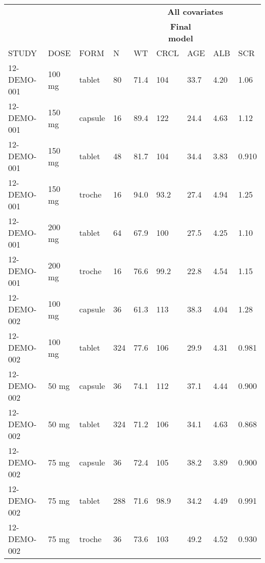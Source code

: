 \documentclass[
]{article}
\newenvironment{Shaded}{\begin{snugshade}}{\end{snugshade}}
\newcommand{\ControlFlowTok}[1]{\textcolor[rgb]{0.13,0.29,0.53}{\textbf{#1}}}
\newcommand{\DataTypeTok}[1]{\textcolor[rgb]{0.13,0.29,0.53}{#1}}
\newcommand{\KeywordTok}[1]{\textcolor[rgb]{0.13,0.29,0.53}{\textbf{#1}}}
\newcommand{\NormalTok}[1]{#1}
\newcommand{\OperatorTok}[1]{\textcolor[rgb]{0.81,0.36,0.00}{\textbf{#1}}}
\newcommand{\StringTok}[1]{\textcolor[rgb]{0.31,0.60,0.02}{#1}}
\begin{document}
\begin{table}[h]
\centering
{\def\arraystretch{1.4}\tabcolsep=5pt
\begin{threeparttable}
\begin{tabular}[h]{lllllllll}
\hline
\multicolumn{4}{c}{} & \multicolumn{5}{c}{\textbf{All covariates}}\\
\cmidrule(lr){5-9}
\multicolumn{5}{c}{} & \multicolumn{2}{c}{\textbf{Final model}} & \multicolumn{2}{c}{}\\
\cmidrule(lr){6-7}
STUDY & DOSE & FORM & N & WT & CRCL & AGE & ALB & SCR \\
\hline
12-DEMO-001 & 100 mg & tablet & 80 & 71.4 & 104 & 33.7 & 4.20 & 1.06 \\
12-DEMO-001 & 150 mg & capsule & 16 & 89.4 & 122 & 24.4 & 4.63 & 1.12 \\
12-DEMO-001 & 150 mg & tablet & 48 & 81.7 & 104 & 34.4 & 3.83 & 0.910 \\
12-DEMO-001 & 150 mg & troche & 16 & 94.0 & 93.2 & 27.4 & 4.94 & 1.25 \\
12-DEMO-001 & 200 mg & tablet & 64 & 67.9 & 100 & 27.5 & 4.25 & 1.10 \\
12-DEMO-001 & 200 mg & troche & 16 & 76.6 & 99.2 & 22.8 & 4.54 & 1.15 \\
12-DEMO-002 & 100 mg & capsule & 36 & 61.3 & 113 & 38.3 & 4.04 & 1.28 \\
12-DEMO-002 & 100 mg & tablet & 324 & 77.6 & 106 & 29.9 & 4.31 & 0.981 \\
12-DEMO-002 & 50 mg & capsule & 36 & 74.1 & 112 & 37.1 & 4.44 & 0.900 \\
12-DEMO-002 & 50 mg & tablet & 324 & 71.2 & 106 & 34.1 & 4.63 & 0.868 \\
12-DEMO-002 & 75 mg & capsule & 36 & 72.4 & 105 & 38.2 & 3.89 & 0.900 \\
12-DEMO-002 & 75 mg & tablet & 288 & 71.6 & 98.9 & 34.2 & 4.49 & 0.991 \\
12-DEMO-002 & 75 mg & troche & 36 & 73.6 & 103 & 49.2 & 4.52 & 0.930 \\
\hline
\end{tabular}
\end{threeparttable}
}
\end{table}

\begin{Shaded}
\end{Shaded}
\end{document}
